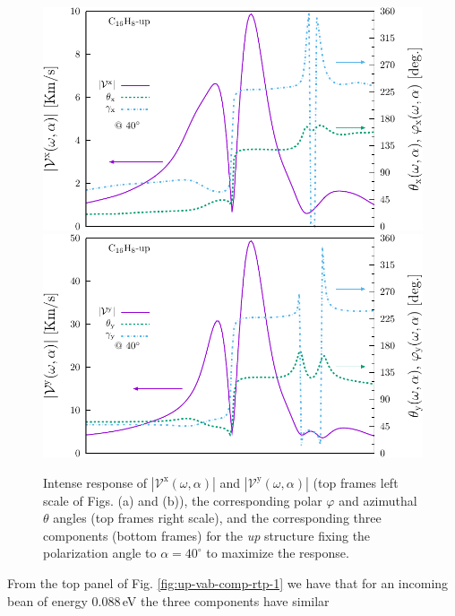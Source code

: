 \documentclass[prb,11pt,tightenlines,twocolumn,aps]{revtex4-1}
\begin{document}
\begin{figure}[t]
    \centering
    \includegraphics[width=\linewidth]{upplots/up-vxb-rtp-m2}
    \\
    \includegraphics[width=\linewidth]{upplots/up-vyb-rtp-m2}
    
    \caption{Intense response of
    $|\mathcal{V}^{\mathrm{x}}(\omega,\alpha)|$ and
    $|\mathcal{V}^{\mathrm{y}}(\omega,\alpha)|$ (top frames left scale of Figs.
    (a) and (b)), the corresponding polar $\varphi$ and azimuthal $\theta$
    angles (top frames right scale), and the corresponding three components
    (bottom frames) for the \emph{up} structure fixing the polarization angle to
    $\alpha=40^{\circ}$ to maximize the response.}

    \label{fig:up-vab-comp-rtp-2}
\end{figure}
From the top panel of Fig. \ref{fig:up-vab-comp-rtp-1} we have that for an
incoming bean of energy 0.088\,eV the three components have similar
\end{document}
